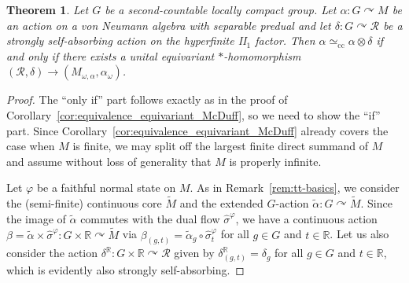 \documentclass[11pt,a4paper]{article}
\newtheorem{theorem}{Theorem}
\theoremstyle{definition}
\theoremstyle{remark}
\numberwithin{equation}{section}
\numberwithin{theorem}{section}
\renewcommand{\tilde}{\widetilde}
\newcommand{\acts}{\curvearrowright}
\begin{document}
\begin{theorem} \label{thm:general-McDuff}
Let $G$ be a second-countable locally compact group.
Let $\alpha: G \acts M$ be an action on a von Neumann algebra with separable predual and let $\delta: G \acts \mathcal{R}$ be a strongly self-absorbing action on the hyperfinite II$_1$ factor.
Then $\alpha\simeq_{\mathrm{cc}}\alpha\otimes\delta$ if and only if there exists a unital equivariant $*$-homomorphism $(\mathcal R,\delta) \to (M_{\omega,\alpha},\alpha_\omega)$.
\end{theorem}
\begin{proof}
The ``only if'' part follows exactly as in the proof of Corollary~\ref{cor:equivalence_equivariant_McDuff}, so we need to show the ``if'' part.
Since Corollary~\ref{cor:equivalence_equivariant_McDuff} already covers the case when $M$ is finite, we may split off the largest finite direct summand of $M$ and assume without loss of generality that $M$ is properly infinite.

Let $\varphi$ be a faithful normal state on $M$.
As in Remark~\ref{rem:tt-basics}, we consider the (semi-finite) continuous core $\tilde{M}$ and the extended $G$-action $\tilde{\alpha}: G\curvearrowright\tilde{M}$.
Since the image of $\tilde{\alpha}$ commutes with the dual flow $\hat{\sigma}^{\varphi}$, we have a continuous action $\beta=\tilde{\alpha}\times\hat{\sigma}^\varphi: G\times\mathbb{R}\curvearrowright\tilde{M}$ via $\beta_{(g,t)}=\tilde{\alpha}_g\circ\hat{\sigma}^\varphi_t$ for all $g\in G$ and $t\in\mathbb{R}$.
Let us also consider the action $\delta^{\mathbb R}: G\times\mathbb{R}\curvearrowright\mathcal R$ given by $\delta^{\mathbb R}_{(g,t)}=\delta_g$ for all $g\in G$ and $t\in\mathbb{R}$, which is evidently also strongly self-absorbing.


\end{proof}
\end{document}
